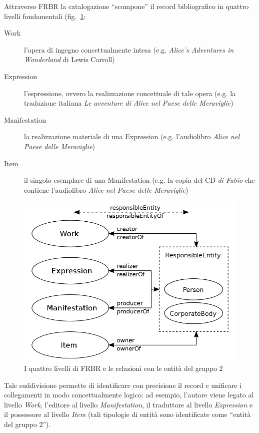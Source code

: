 Attraverso FRBR la catalogazione ``scompone'' il record bibliografico in quattro livelli fondamentali (fig.~\ref{fig:frbf-levels}:
\begin{description}
\item[Work] l'opera di ingegno concettualmente intesa (e.g. \emph{Alice's Adventures in Wonderland} di Lewis Carroll)
\item[Expression] l'espressione, ovvero la realizzazione concettuale di tale opera (e.g. la traduzione italiana \emph{Le avventure di Alice nel Paese delle Meraviglie})
\item[Manifestation] la realizzazione materiale di una Expression (e.g. l'audiolibro \emph{Alice nel Paese delle Meraviglie})
\item[Item] il singolo esemplare di una Manifestation (e.g. la copia del CD \emph{di Fabio} che contiene l'audiolibro \emph{Alice nel Paese delle Meraviglie})
\end{description}

\begin{figure}
  \centering
  \includegraphics[width=\textwidth]{images/FRBR-Group-2-entities-and-relations.png}
  \caption{I quattro livelli di FRBR e le relazioni con le entità del gruppo 2}\label{fig:frbf-levels}
\end{figure}

Tale suddivisione permette di identificare con precisione il record e unificare i collegamenti in modo concettualmente logico: ad esempio, l'autore viene legato al livello \emph{Work}, l'editore al livello \emph{Manifestation}, il traduttore al livello \emph{Expression} e il possessore al livello \emph{Item} (tali tipologie di entità sono identificate come ``entità del gruppo 2'').

